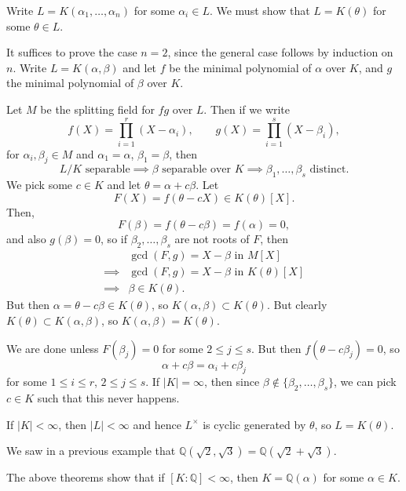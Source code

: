\documentclass[12pt]{article}
\begin{document}
\begin{proofbox}
	Write $L = K(\alpha_1, \ldots, \alpha_n)$ for some $\alpha_i \in L$. We must show that $L = K(\theta)$ for some $\theta \in L$.

	It suffices to prove the case $n = 2$, since the general case follows by induction on $n$. Write $L = K(\alpha, \beta)$ and let $f$ be the minimal polynomial of $\alpha$ over $K$, and $g$ the minimal polynomial of $\beta$ over $K$.

	Let $M$ be the splitting field for $fg$ over $L$. Then if we write
	\[
	f(X) = \prod_{i = 1}^{r} (X-\alpha_i), \qquad g(X) = \prod_{i = 1}^{s} (X - \beta_i),
	\]
	for $\alpha_i, \beta_j \in M$ and $\alpha_1 = \alpha$, $\beta_1 = \beta$, then
	\[
		L/K \text{ separable} \implies \beta \text{ separable over } K \implies \beta_1, \ldots, \beta_s \text{ distinct}.
	\]
	We pick some $c \in K$ and let $\theta = \alpha + c\beta$. Let
	\[
		F(X) = f(\theta - cX) \in K(\theta)[X].
	\]
	Then,
	\[
	F(\beta) = f(\theta - c\beta) = f(\alpha) = 0,
	\]
	and also $g(\beta) = 0$, so if $\beta_2, \ldots, \beta_s$ are not roots of $F$, then
	\begin{align*}
		&\gcd(F,g) = X - \beta \text{ in } M[X]\\
		\implies &\gcd(F,g) = X - \beta \text{ in } K(\theta)[X] \\
		\implies&\beta \in K(\theta).
	\end{align*}
	But then $\alpha = \theta - c \beta \in K(\theta)$, so $K(\alpha, \beta) \subset K(\theta)$. But clearly $K(\theta) \subset K(\alpha,\beta)$, so $K(\alpha, \beta) = K(\theta)$.

	We are done unless $F(\beta_j) = 0$ for some $2 \leq j \leq s$. But then $f(\theta - c \beta_j) = 0$, so
	\[
	\alpha + c \beta = \alpha_i + c \beta_j
	\]
	for some $1 \leq i \leq r$, $2 \leq j \leq s$. If $|K| = \infty$, then since $\beta \notin \{\beta_2, \ldots, \beta_s\}$, we can pick $c \in K$ such that this never happens.

	If $|K| < \infty$, then $|L| < \infty$ and hence $L^{\times}$ is cyclic generated by $\theta$, so $L = K(\theta)$.
\end{proofbox}

\begin{exbox}
	We saw in a previous example that $\mathbb{Q}(\sqrt 2, \sqrt 3) = \mathbb{Q}(\sqrt 2 + \sqrt 3)$.
\end{exbox}


\begin{remark}
	The above theorems show that if $[K: \mathbb{Q}] < \infty$, then $K = \mathbb{Q}(\alpha)$ for some $\alpha \in K$.
\end{remark}
\end{document}
